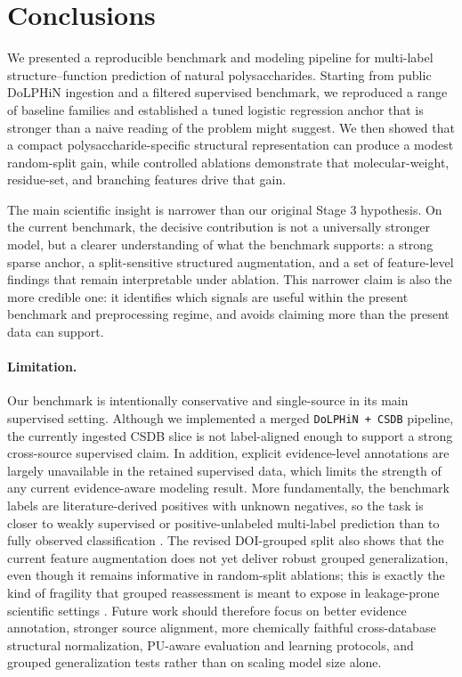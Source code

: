\documentclass{article}
\begin{document}
\section{Conclusions}
\label{sec:conclusion}

We presented a reproducible benchmark and modeling pipeline for multi-label structure--function prediction of natural polysaccharides. Starting from public DoLPHiN ingestion and a filtered supervised benchmark, we reproduced a range of baseline families and established a tuned logistic regression anchor that is stronger than a naive reading of the problem might suggest. We then showed that a compact polysaccharide-specific structural representation can produce a modest random-split gain, while controlled ablations demonstrate that molecular-weight, residue-set, and branching features drive that gain.

The main scientific insight is narrower than our original Stage 3 hypothesis. On the current benchmark, the decisive contribution is not a universally stronger model, but a clearer understanding of what the benchmark supports: a strong sparse anchor, a split-sensitive structured augmentation, and a set of feature-level findings that remain interpretable under ablation. This narrower claim is also the more credible one: it identifies which signals are useful within the present benchmark and preprocessing regime, and avoids claiming more than the present data can support.

\paragraph{Limitation.}
Our benchmark is intentionally conservative and single-source in its main supervised setting. Although we implemented a merged \texttt{DoLPHiN + CSDB} pipeline, the currently ingested CSDB slice is not label-aligned enough to support a strong cross-source supervised claim. In addition, explicit evidence-level annotations are largely unavailable in the retained supervised data, which limits the strength of any current evidence-aware modeling result. More fundamentally, the benchmark labels are literature-derived positives with unknown negatives, so the task is closer to weakly supervised or positive-unlabeled multi-label prediction than to fully observed classification \cite{li2022pu}. The revised DOI-grouped split also shows that the current feature augmentation does not yet deliver robust grouped generalization, even though it remains informative in random-split ablations; this is exactly the kind of fragility that grouped reassessment is meant to expose in leakage-prone scientific settings \cite{kapoor2023leakage}. Future work should therefore focus on better evidence annotation, stronger source alignment, more chemically faithful cross-database structural normalization, PU-aware evaluation and learning protocols, and grouped generalization tests rather than on scaling model size alone.
\end{document}
